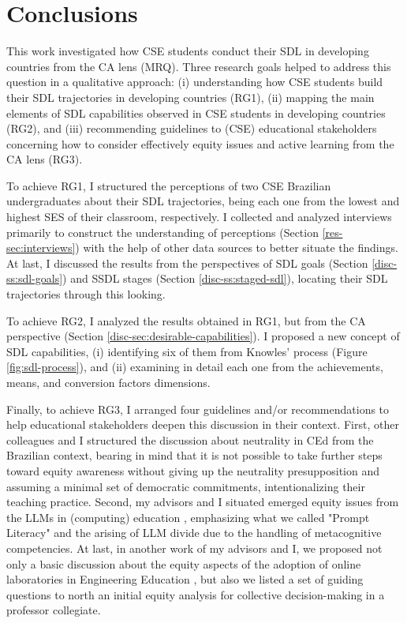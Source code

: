 \chapter{Conclusions}
\label{chap:final-remarks}

 This work investigated how \gls{CSE} students conduct their \gls{SDL} in developing countries from the \gls{CA} lens (\gls{MRQ}). Three research goals helped to address this question in a qualitative approach: (i) understanding how \gls{CSE} students build their \gls{SDL} trajectories in developing countries (\gls{RG}1), (ii) mapping the main elements of \gls{SDL} capabilities observed in \gls{CSE} students in developing countries (\gls{RG}2), and (iii) recommending guidelines to (\gls{CSE}) educational stakeholders concerning how to consider effectively equity issues and active learning from the \gls{CA} lens (\gls{RG}3).

To achieve \gls{RG}1, I structured the perceptions of two \gls{CSE} Brazilian undergraduates about their \gls{SDL} trajectories, being each one from the lowest and highest \gls{SES} of their classroom, respectively. I collected and analyzed interviews primarily to construct the understanding of perceptions (Section \ref{res-sec:interviews}) with the help of other data sources to better situate the findings. At last, I discussed the results from the perspectives of \gls{SDL} goals (Section \ref{disc-ss:sdl-goals}) and \gls{SSDL} stages (Section \ref{disc-ss:staged-sdl}), locating their \gls{SDL} trajectories through this looking. 

To achieve \gls{RG}2, I analyzed the results obtained in \gls{RG}1, but from the \gls{CA} perspective (Section \ref{disc-sec:desirable-capabilities}). I proposed a new concept of \gls{SDL} capabilities, (i) identifying six of them from Knowles' process (Figure \ref{fig:sdl-process}), and (ii) examining in detail each one from the achievements, means, and conversion factors dimensions.

 Finally, to achieve \gls{RG}3, I arranged four guidelines and/or recommendations to help educational stakeholders deepen this discussion in their context. First, other colleagues and I structured the discussion about neutrality in \gls{CEd} \cite{bispojr:2022-educomp} from the Brazilian context, bearing in mind that it is not possible to take further steps toward equity awareness without giving up the neutrality presupposition and assuming a minimal set of democratic commitments, intentionalizing their teaching practice. Second, my advisors and I situated emerged equity issues from the \glspl{LLM} in (computing) education \cite{bispojr:2024-nmp}, emphasizing what we called "Prompt Literacy" and the arising of \gls{LLM} divide due to the handling of metacognitive competencies. At last, in another work of my advisors and I, we proposed not only a basic discussion about the equity aspects of the adoption of online laboratories in Engineering Education \cite{bispojr:2024-online-lab}, but also we listed a set of guiding questions to north an initial equity analysis for collective decision-making in a professor collegiate. %

